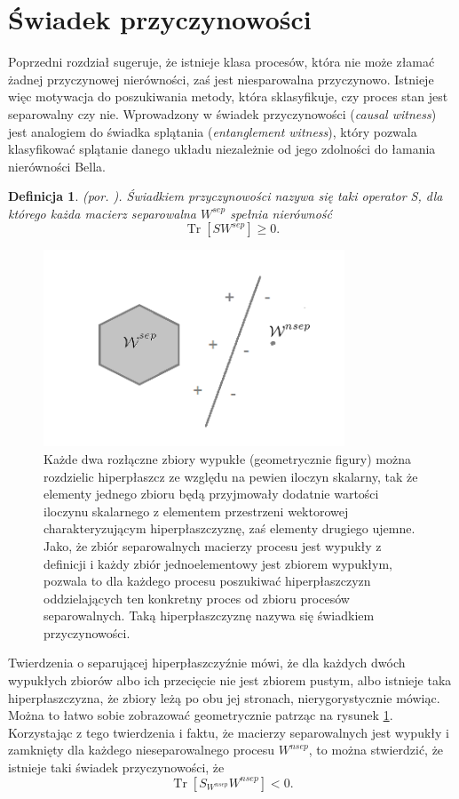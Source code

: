 \documentclass[10pt]{article} %
\newtheorem{definicja}{Definicja}
\DeclareMathOperator{\Trs}{Tr}
\begin{document}
\section{Świadek przyczynowości} 
Poprzedni rozdział sugeruje, że istnieje klasa procesów, która nie może złamać żadnej przyczynowej nierówności, zaś jest niesparowalna przyczynowo. Istnieje więc motywacja do poszukiwania metody, która sklasyfikuje, czy proces stan jest separowalny czy nie. Wprowadzony w \cite{causal_witness}
świadek przyczynowości (\textit{causal witness}) jest analogiem do świadka splątania (\textit{entanglement witness}), który pozwala klasyfikować splątanie danego układu niezależnie od jego zdolności do łamania nierówności Bella. 
\begin{definicja}
(por. \cite{causal_witness}).
Świadkiem przyczynowości nazywa się taki operator S, dla którego każda macierz separowalna $W^{sep}$ spełnia nierówność
\begin{equation}
\label{eq:witness_gez}
\Trs\left[S W^{sep} \right]\geq 0.
\end{equation}
\end{definicja}
\begin{figure}[t]
\centering
\includegraphics[width=0.8\textwidth]{obrazki/hip}
\caption{Każde dwa rozłączne zbiory wypukłe (geometrycznie figury) można rozdzielic hiperpłaszcz ze względu na pewien iloczyn skalarny, tak że elementy jednego zbioru będą przyjmowały dodatnie wartości iloczynu skalarnego z elementem przestrzeni wektorowej charakteryzującym hiperpłaszczyznę, zaś elementy drugiego ujemne. Jako, że zbiór separowalnych macierzy procesu jest wypukły z definicji i każdy zbiór jednoelementowy jest zbiorem wypukłym, pozwala to dla każdego procesu poszukiwać hiperpłaszczyzn oddzielających ten konkretny proces od zbioru procesów separowalnych. Taką hiperpłaszczyznę nazywa się świadkiem przyczynowości.
}
\label{fig:hip}
\end{figure}
Twierdzenia o separującej hiperpłaszczyźnie mówi, że dla każdych dwóch wypukłych zbiorów albo ich przecięcie nie jest zbiorem pustym, albo istnieje taka hiperpłaszczyzna, że zbiory leżą po obu jej stronach, nierygorystycznie mówiąc. Można to łatwo sobie zobrazować geometrycznie patrząc na rysunek \ref{fig:hip}. Korzystając z tego twierdzenia i faktu, że macierzy separowalnych jest wypukły i zamknięty dla każdego nieseparowalnego procesu $W^{nsep}$, to można stwierdzić, że istnieje taki świadek przyczynowości, że 
\begin{equation}
\Trs \left[ S_{W^{nsep}} W^{nsep} \right] < 0.
\end{equation}
\end{document}
